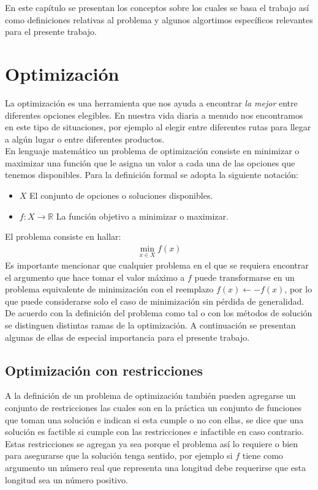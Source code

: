 En este capítulo se presentan los conceptos sobre los cuales se basa el trabajo así como definiciones relativas al problema y algunos algortimos específicos relevantes para el presente trabajo.
\section{Optimización}
La optimización es una herramienta que nos ayuda a encontrar \textit{la mejor} entre diferentes opciones elegibles. En nuestra vida diaria a menudo nos encontramos en este tipo de situaciones, por ejemplo al elegir entre diferentes rutas para llegar a algún lugar o entre diferentes productos.\\

En lenguaje matemático un problema de optimización consiste en minimizar o maximizar una función que le asigna un valor a cada una de las opciones que tenemos disponibles. Para la definición formal se adopta la siguiente notación:
\begin{itemize}
    \item $X$ El conjunto de opciones o soluciones disponibles.
    \item $f:X\rightarrow \mathbb{R}$ La función objetivo a minimizar o maximizar.
\end{itemize}
El problema consiste en hallar:
\begin{gather}
\min_{x\in X} f(x)
\end{gather}
Es importante mencionar que cualquier problema en el que se requiera encontrar el argumento que hace tomar el valor máximo a $f$ puede transformarse en un problema equivalente de minimización con el reemplazo $f(x) \leftarrow -f(x)$, por lo que puede considerarse solo el caso de minimización sin pérdida de generalidad.\\

De acuerdo con la definición del problema como tal o con los métodos de solución se distinguen distintas ramas de la optimización. A continuación se presentan algunas de ellas de especial importancia para el presente trabajo.

\subsection*{Optimización con restricciones}
A la definición de un problema de optimización también pueden agregarse un conjunto de restricciones las cuales son en la práctica un conjunto de funciones que toman una solución e indican si esta cumple o no con ellas, se dice que una solución es factible si cumple con las restricciones e infactible en caso contrario. Estas restricciones se agregan ya sea porque el problema así lo requiere o bien para asegurarse que la solución tenga sentido, por ejemplo si $f$ tiene como argumento un número real que representa una longitud debe requerirse que esta longitud sea un número positivo.\\

